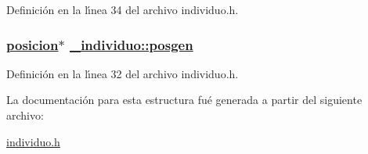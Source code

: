 Definici\'{o}n en la l\'{\i}nea 34 del archivo individuo.h.\hypertarget{struct__individuo_2187e821ff69e7e3de9fa511745f976a_2187e821ff69e7e3de9fa511745f976a}{
\subsubsection[posgen]{\setlength{\rightskip}{0pt plus 5cm}\hyperlink{struct__posicion}{posicion}$\ast$ \hyperlink{struct__individuo_2187e821ff69e7e3de9fa511745f976a_2187e821ff69e7e3de9fa511745f976a}{\_\-individuo::posgen}}}
\label{struct__individuo_2187e821ff69e7e3de9fa511745f976a_2187e821ff69e7e3de9fa511745f976a}




Definici\'{o}n en la l\'{\i}nea 32 del archivo individuo.h.

La documentaci\'{o}n para esta estructura fu\'{e} generada a partir del siguiente archivo:\begin{CompactItemize}
\item 
\hyperlink{individuo_8h}{individuo.h}\end{CompactItemize}
